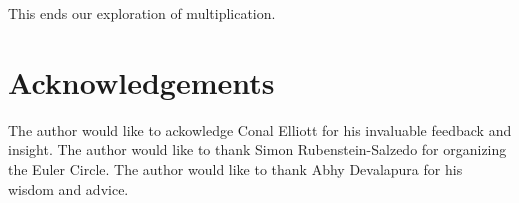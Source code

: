 \documentclass[14pt]{extarticle}  %
\newcommand{\atticus}[1]{\textbf{AK: #1}}
\begin{document}

This ends our exploration of multiplication.



\section*{Acknowledgements}
The author would like to ackowledge Conal Elliott for his invaluable feedback and insight. The author would like to thank Simon Rubenstein-Salzedo for organizing the Euler Circle.
The author would like to thank Abhy Devalapura for his wisdom and advice.


\end{document}
